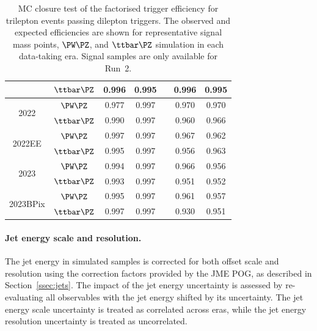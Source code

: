 \begin{table}[htbp]
\begin{tabular}{ccccccc}
                                 & $\ttbar\PZ$                   & 0.996 & 0.995 & & 0.996 & 0.995 \\
    \hline
    \multirow{2}{*}{2022}        & $\PW\PZ$                      & 0.977 & 0.997 & & 0.970 & 0.970 \\
                                 & $\ttbar\PZ$                   & 0.990 & 0.997 & & 0.960 & 0.966 \\
    \hline
    \multirow{2}{*}{2022EE}      & $\PW\PZ$                      & 0.997 & 0.997 & & 0.967 & 0.962 \\
                                 & $\ttbar\PZ$                   & 0.995 & 0.997 & & 0.956 & 0.963 \\
    \hline
    \multirow{2}{*}{2023}        & $\PW\PZ$                      & 0.994 & 0.997 & & 0.966 & 0.956 \\
                                 & $\ttbar\PZ$                   & 0.993 & 0.997 & & 0.951 & 0.952 \\
    \hline
    \multirow{2}{*}{2023BPix}    & $\PW\PZ$                      & 0.995 & 0.997 & & 0.961 & 0.957 \\
                                 & $\ttbar\PZ$                   & 0.997 & 0.997 & & 0.930 & 0.951 \\
    \hline
  \end{tabular}
  \caption{MC closure test of the factorised trigger efficiency for trilepton events passing dilepton triggers. The observed and expected efficiencies are shown for representative signal mass points, $\PW\PZ$, and $\ttbar\PZ$ simulation in each data-taking era. Signal samples are only available for Run~2.}
  \label{tab:trig_closure_trilep}
\end{table}

\paragraph{Jet energy scale and resolution.}
The jet energy in simulated samples is corrected for both offset scale and resolution using the correction factors provided by the JME POG, as described in Section~\ref{ssec:jets}. The impact of the jet energy uncertainty is assessed by re-evaluating all observables with the jet energy shifted by its uncertainty. The jet energy scale uncertainty is treated as correlated across eras, while the jet energy resolution uncertainty is treated as uncorrelated.

